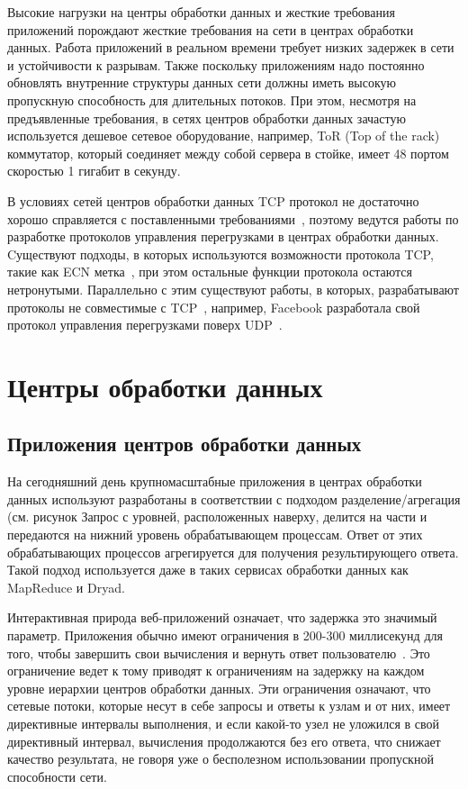 \documentclass[14pt, a4paper,oneside]{extarticle}
\begin{document}
Высокие нагрузки на центры обработки данных и жесткие требования приложений порождают жесткие требования на сети в центрах обработки данных. Работа приложений в реальном времени требует низких задержек в сети и устойчивости к разрывам. Также поскольку приложениям надо постоянно обновлять внутренние структуры данных сети должны иметь высокую пропускную способность для длительных потоков. При этом, несмотря на предъявленные требования, в сетях центров обработки данных зачастую используется дешевое сетевое оборудование, например, ToR (Top of the rack) коммутатор, который соединяет между собой сервера в стойке, имеет 48 портом скоростью 1 гигабит в секунду.

В условиях сетей центров обработки данных TCP протокол не достаточно хорошо справляется с поставленными требованиями~\cite{dctcp}, поэтому ведутся работы по разработке протоколов управления перегрузками в центрах обработки данных.
Cуществуют подходы, в которых используются возможности протокола TCP, такие как ECN метка~\cite{dctp, d2tcp}, при этом остальные функции протокола остаются нетронутыми.
Параллельно с этим существуют работы, в которых, разрабатывают протоколы не совместимые с TCP~\cite{d3tcp}, например, Facebook разработала свой протокол управления перегрузками поверх UDP~\cite{facebook}.

\newpage

\section{Центры обработки данных}
\subsection{Приложения центров обработки данных}

На сегодняшний день крупномасштабные приложения в центрах обработки данных используют разработаны в соответствии с подходом разделение/агрегация (см. рисунок %
Запрос с уровней, расположенных наверху, делится на части и передаются на нижний уровень обрабатывающем процессам. Ответ от этих обрабатывающих процессов агрегируется для получения результирующего ответа. Такой подход используется даже в таких сервисах обработки данных как MapReduce и  Dryad. %

Интерактивная природа веб-приложений означает, что задержка это значимый параметр. Приложения обычно имеют ограничения в 200-300 миллисекунд для того, чтобы завершить свои вычисления и вернуть ответ пользователю~\cite{sla}. Это ограничение ведет к тому приводят к ограничениям на задержку на каждом уровне иерархии центров обработки данных. Эти ограничения означают, что сетевые потоки, которые несут в себе запросы и ответы к узлам и от них, имеет директивные интервалы выполнения, и если какой-то узел не уложился в свой директивный интервал, вычисления продолжаются без его ответа, что снижает качество результата, не говоря уже о бесполезном использовании пропускной способности сети.
\end{document}

